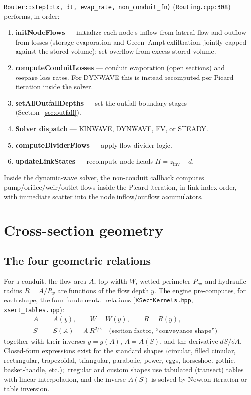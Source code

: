 \documentclass[11pt,a4paper]{article}
\begin{document}
\texttt{Router::step(ctx, dt, evap\_rate, non\_conduit\_fn)}
(\texttt{Routing.cpp:308}) performs, in order:
\begin{enumerate}[nosep]
  \item \textbf{initNodeFlows} --- initialize each node's inflow from lateral
        flow and outflow from losses (storage evaporation and Green--Ampt
        exfiltration, jointly capped against the stored volume); set overflow
        from excess stored volume.
  \item \textbf{computeConduitLosses} --- conduit evaporation (open sections)
        and seepage loss rates. For DYNWAVE this is instead recomputed per
        Picard iteration inside the solver.
  \item \textbf{setAllOutfallDepths} --- set the outfall boundary stages
        (Section~\ref{sec:outfall}).
  \item \textbf{Solver dispatch} --- KINWAVE, DYNWAVE, FV, or STEADY.
  \item \textbf{computeDividerFlows} --- apply flow-divider logic.
  \item \textbf{updateLinkStates} --- recompute node heads $H = z_{\mathrm{inv}}
        + d$.
\end{enumerate}

Inside the dynamic-wave solver, the non-conduit callback computes
pump/orifice/weir/outlet flows inside the Picard iteration, in link-index
order, with immediate scatter into the node inflow/outflow accumulators.

\section{Cross-section geometry}
\label{sec:xsect}

\subsection{The four geometric relations}

For a conduit, the flow area $A$, top width $W$, wetted perimeter $P_w$, and
hydraulic radius $R = A/P_w$ are functions of the flow depth $y$. The engine
pre-computes, for each shape, the four fundamental relations
(\texttt{XSectKernels.hpp}, \texttt{xsect\_tables.hpp}):
\begin{align}
  A &= A(y), \qquad W = W(y), \qquad R = R(y), \\
  S &= S(A) = A\,R^{2/3} \quad \text{(section factor, ``conveyance shape''),}
\end{align}
together with their inverses $y = y(A)$, $A = A(S)$, and the derivative
$dS/dA$. Closed-form expressions exist for the standard shapes (circular,
filled circular, rectangular, trapezoidal, triangular, parabolic, power,
eggs, horseshoe, gothic, basket-handle, etc.); irregular and custom shapes use
tabulated (transect) tables with linear interpolation, and the inverse
$A(S)$ is solved by Newton iteration or table inversion.
\end{document}
